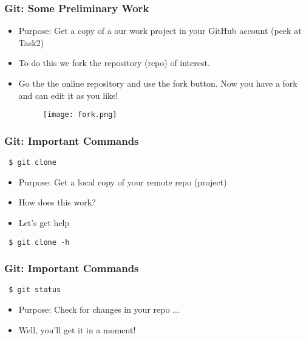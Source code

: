\documentclass{beamer} %
\begin{document}
\begin{frame}[t, fragile]
\frametitle{Git: Some Preliminary Work}

\begin{itemize}
    \setlength\itemsep{1em}
	\item Purpose: Get a copy of a our work project in your GitHub account (peek at Task2)
    \item To do this we fork the repository (repo) of interest.
    \item Go the the online repository and use the fork button. Now you have a fork and can edit it as you like! \begin{figure}
    \begin{center}
    	\texttt{[image: fork.png]}
    \end{center}
\end{figure}   
\end{itemize}
\end{frame}

\begin{frame}[t, fragile]
\frametitle{Git: Important Commands}

\begin{verbatim} 
 $ git clone
\end{verbatim}

\begin{itemize}
    \setlength\itemsep{1em}
	\item Purpose: Get a local copy of your remote repo (project)
    \item How does this work?
    \item Let's get help
\end{itemize}

\begin{verbatim} 
 $ git clone -h
\end{verbatim}

\end{frame}

\begin{frame}[t, fragile]
\frametitle{Git: Important Commands}

\begin{verbatim} 
 $ git status
\end{verbatim}

\begin{itemize}
    \setlength\itemsep{1em}
	\item Purpose: Check for changes in your repo ...
    \item Well, you'll get it in a moment!
\end{itemize}
\end{frame}
\end{document}

